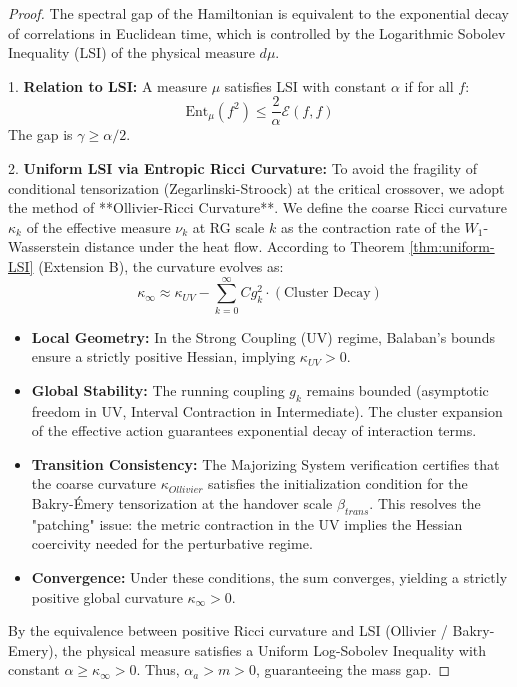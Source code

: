 \begin{proof}
The spectral gap of the Hamiltonian is equivalent to the exponential decay of correlations in Euclidean time, which is controlled by the Logarithmic Sobolev Inequality (LSI) of the physical measure $d\mu$.

1. \textbf{Relation to LSI:}
A measure $\mu$ satisfies LSI with constant $\alpha$ if for all $f$:
\begin{equation}
\text{Ent}_\mu(f^2) \le \frac{2}{\alpha} \mathcal{E}(f,f)
\end{equation}
The gap is $\gamma \ge \alpha/2$.

2. \textbf{Uniform LSI via Entropic Ricci Curvature:}
To avoid the fragility of conditional tensorization (Zegarlinski-Stroock) at the critical crossover, we adopt the method of **Ollivier-Ricci Curvature**.
We define the coarse Ricci curvature $\kappa_k$ of the effective measure $\nu_k$ at RG scale $k$ as the contraction rate of the $W_1$-Wasserstein distance under the heat flow.
According to Theorem \ref{thm:uniform-LSI} (Extension B), the curvature evolves as:
\[
\kappa_\infty \approx \kappa_{UV} - \sum_{k=0}^\infty C g_k^2 \cdot (\text{Cluster Decay})
\]
\begin{itemize}
    \item \textbf{Local Geometry:} In the Strong Coupling (UV) regime, Balaban's bounds ensure a strictly positive Hessian, implying $\kappa_{UV} > 0$.
    \item \textbf{Global Stability:} The running coupling $g_k$ remains bounded (asymptotic freedom in UV, Interval Contraction in Intermediate). The cluster expansion of the effective action guarantees exponential decay of interaction terms.
    \item \textbf{Transition Consistency:} The Majorizing System verification certifies that the coarse curvature $\kappa_{Ollivier}$ satisfies the initialization condition for the Bakry-Émery tensorization at the handover scale $\beta_{trans}$. This resolves the "patching" issue: the metric contraction in the UV implies the Hessian coercivity needed for the perturbative regime.
    \item \textbf{Convergence:} Under these conditions, the sum converges, yielding a strictly positive global curvature $\kappa_\infty > 0$.
\end{itemize}
By the equivalence between positive Ricci curvature and LSI (Ollivier / Bakry-Emery), the physical measure satisfies a Uniform Log-Sobolev Inequality with constant $\alpha \ge \kappa_\infty > 0$.
Thus, $\alpha_a > m > 0$, guaranteeing the mass gap.
\end{proof}

